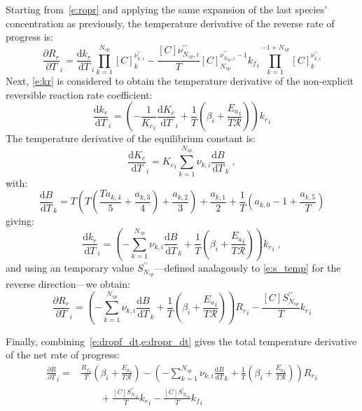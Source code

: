 \documentclass[12pt]{article}
\newcommand{\ns}{N_{sp}}
\newcommand{\Ru}{\mathcal{R}}
\begin{document}
Starting from~\cref{e:ropr} and applying the same expansion of the last species' concentration as previously, the temperature derivative of the reverse rate of progress is:
\begin{equation}
 \frac{\partial {R_r} }{\partial T }_{i} = \frac{\text{d} {k_r} }{\text{d} T }_{i} \prod_{k=1}^{\ns} [C]_{k}^{\nu^{\prime\prime}_{k,i}} - \frac{[C] \nu^{\prime\prime}_{\ns,i}}{T} [C]_{\ns}^{\nu^{\prime\prime}_{\ns,i} - 1} {k_f}_{i} \prod_{k=1}^{-1 + \ns} [C]_{k}^{\nu^{\prime\prime}_{k,i}}
\end{equation}
Next, \cref{e:kr} is considered to obtain the temperature derivative of the non-explicit reversible reaction rate coefficient:
\begin{equation}
 \frac{\text{d} {k_r} }{\text{d} T }_{i} = \left(- \frac{1}{{K_c}_{i}} \frac{\text{d} {K_c} }{\text{d} T }_{i} + \frac{1}{T} \left(\beta_{i} + \frac{{E_{a}}_{i}}{T \Ru}\right)\right) {k_r}_{i}
\end{equation}
The temperature derivative of the equilibrium constant is:
\begin{equation}
 \frac{\text{d} {K_c} }{\text{d} T }_{i} = {K_c}_{i} \sum_{k=1}^{\ns} \nu_{k,i} \frac{\text{d} B }{\text{d} T }_{k} \;,
\end{equation}
with:
\begin{equation}
 \frac{\text{d} B }{\text{d} T }_{k} = T \left(T \left(\frac{T a_{k,4}}{5} + \frac{a_{k,3}}{4}\right) + \frac{a_{k,2}}{3}\right) + \frac{a_{k,1}}{2} + \frac{1}{T} \left(a_{k,0} - 1 + \frac{a_{k,5}}{T}\right)
\end{equation}
giving:
\begin{equation}
\label{e:dkr_dt}
\frac{\text{d} {k_r} }{\text{d} T }_{i} = \left(- \sum_{k=1}^{\ns} \nu_{k,i} \frac{\text{d} B }{\text{d} T }_{k} + \frac{1}{T} \left(\beta_{i} + \frac{{E_{a}}_{i}}{T \Ru}\right)\right) {k_r}_{i} \;,
\end{equation}
and using an temporary value $S^{\prime\prime}_{\ns}$---defined analagously to \cref{e:s_temp} for the reverse direction---we obtain:
\begin{equation}
\label{e:dropr_dt}
\frac{\partial {R_r} }{\partial T }_{i} = \left(- \sum_{k=1}^{\ns} \nu_{k,i} \frac{\text{d} B }{\text{d} T }_{k} + \frac{1}{T} \left(\beta_{i} + \frac{{E_{a}}_{i}}{T \Ru}\right)\right) {R_r}_{i} - \frac{[C] S^{\prime\prime}_{\ns}}{T} {k_r}_{i}
\end{equation}

Finally, combining~\cref{e:dropf_dt,e:dropr_dt} gives the total temperature derivative of the net rate of progress:
\begin{align}
 \label{e:drop_dt}
 \frac{\partial R }{\partial T }_{i} =& \frac{{R_f}_{i}}{T} \left(\beta_{i} + \frac{{E_{a}}_{i}}{T \Ru}\right) - \left(- \sum_{k=1}^{\ns} \nu_{k,i} \frac{\text{d} B }{\text{d} T }_{k} + \frac{1}{T} \left(\beta_{i} + \frac{{E_{a}}_{i}}{T \Ru}\right)\right) {R_r}_{i} \nonumber \\
				      &\qquad + \frac{[C] S^{\prime\prime}_{\ns}}{T} {k_r}_{i} - \frac{[C] S^{\prime}_{\ns}}{T} {k_f}_{i}
\end{align}
\end{document}
